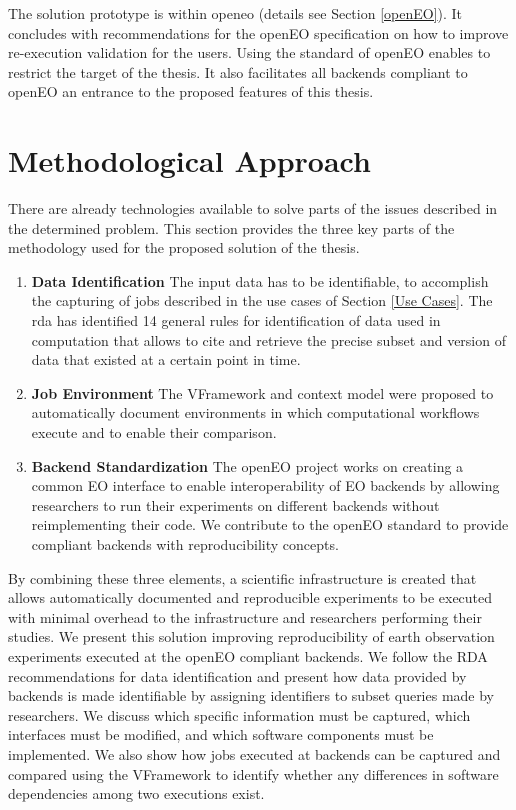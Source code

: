 \documentclass[draft,final]{vutinfth} %
\begin{document}
The solution prototype is within \gls{openeo} (details see Section \ref{openEO}). It concludes with recommendations for the openEO specification on how to improve re-execution validation for the users. Using the standard of openEO enables to restrict the target of the thesis. It also facilitates all backends compliant to openEO an entrance to the proposed features of this thesis. 

\section{Methodological Approach}\label{Method}
There are already technologies available to solve parts of the issues described in the determined problem. This section provides the three key parts of the methodology used for the proposed solution of the thesis.

\begin{enumerate}
	\item \textbf{Data Identification}
	The input data has to be identifiable, to accomplish the capturing of jobs described in the use cases of Section \ref{Use Cases}. The \gls{rda} has identified 14 general rules \cite{rauber2016identification} for identification of data used in computation that allows to cite and retrieve the precise subset and version of data that existed at a certain point in time.
	
	\item \textbf{Job Environment}
	The VFramework \cite{MiksaBiomedical} and context model \cite{MayerOntology} were proposed to automatically document environments in which computational workflows execute and to enable their comparison. 
		
	\item \textbf{Backend Standardization}
	The openEO project \cite{openeo} works on creating a common EO interface to enable interoperability of EO backends by allowing researchers to run their experiments on different backends without reimplementing their code. We contribute to the openEO standard to provide compliant backends with reproducibility concepts.
	
\end{enumerate}

By combining these three elements, a scientific infrastructure is created that allows automatically documented and reproducible experiments to be executed with minimal overhead to the infrastructure and researchers performing their studies. We present this solution improving reproducibility of earth observation experiments executed at the openEO compliant backends. We follow the RDA recommendations for data identification and present how data provided by backends is made identifiable by assigning identifiers to subset queries made by researchers. We discuss which specific information must be captured, which interfaces must be modified, and which software components must be implemented. We also show how jobs executed at backends can be captured and compared using the VFramework to identify whether any differences in software dependencies among two executions exist.
\end{document}
